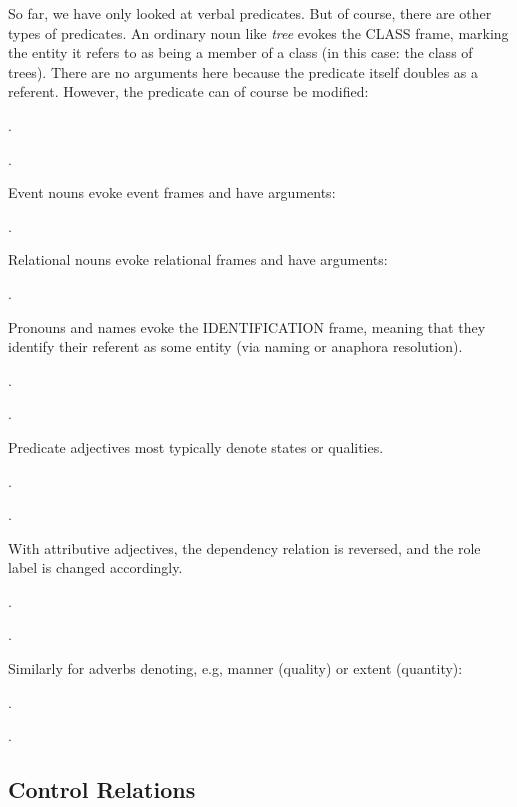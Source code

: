 \documentclass[a4paper]{article}
\newcommand{\fr}[1]{\textsf{#1}}
\newcommand{\rl}[1]{\textsf{#1}}
\begin{document}
So far, we have only looked at verbal predicates. But of course, there are
other types of predicates. An ordinary noun like \emph{tree} evokes the
\fr{CLASS} frame, marking the entity it refers to as being a member of a class
(in this case: the class of trees). There are no arguments here because the
predicate itself doubles as a referent. However, the predicate can of course be
modified:

\ex.

\ex.

Event nouns evoke event frames and have arguments:

\ex.

Relational nouns evoke relational frames and have arguments:

\ex.

Pronouns and names evoke the \fr{IDENTIFICATION} frame, meaning that they
identify their referent as some entity (via naming or anaphora resolution).

\ex.

\ex.

Predicate adjectives most typically denote states or qualities.

\ex.

\ex.

With attributive adjectives, the dependency relation is reversed, and the role label is changed accordingly.

\ex.

\ex.

Similarly for adverbs denoting, e.g, manner (\rl{quality}) or extent (\rl{quantity}):

\ex.

\ex.

\newpage\subsection{Control Relations}
\label{sec:control}

\end{document}
